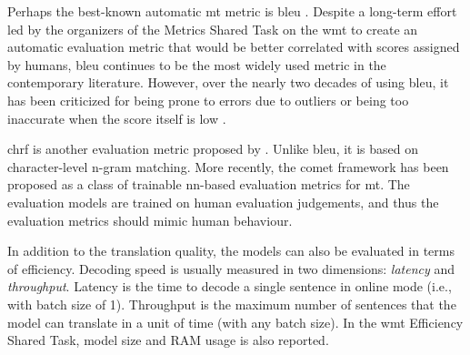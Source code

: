 Perhaps the best-known automatic \ac{mt} metric is \acs{bleu}
\citep{papineni-etal-2002-bleu}.  Despite a long-term effort led by the
organizers of the Metrics Shared Task on the \ac{wmt} to create an automatic
evaluation metric that would be better correlated with scores assigned by
humans, \acs{bleu} continues to be the most widely used metric in the
contemporary literature. However, over the nearly two decades of using
\acs{bleu}, it has been criticized for being prone to errors due to outliers or
being too inaccurate when the score itself is low
\citep{callison-burch-etal-2006-evaluating, bojar-etal-2010-tackling,
  reiter2018structured, mathur-etal-2020-tangled, kocmi2021ship}.

\Acf{chrf} is another evaluation metric proposed by
\citep{popovic-2015-chrf}. Unlike \acs{bleu}, it is based on character-level
n-gram matching. More recently, the \acs{comet} framework
\citep{rei-etal-2020-comet} has been proposed as a class of trainable
\acs{nn}-based evaluation metrics for \ac{mt}. The evaluation models are
trained on human evaluation judgements, and thus the evaluation metrics should
mimic human behaviour.

In addition to the translation quality, the models can also be evaluated in
terms of efficiency. Decoding speed is usually measured in two dimensions:
\emph{latency} and \emph{throughput}. Latency is the time to decode a single
sentence in online mode (i.e., with batch size of 1). Throughput is the maximum
number of sentences that the model can translate in a unit of time (with any
batch size). In the \ac{wmt} Efficiency Shared Task, model size and RAM usage
is also reported.

